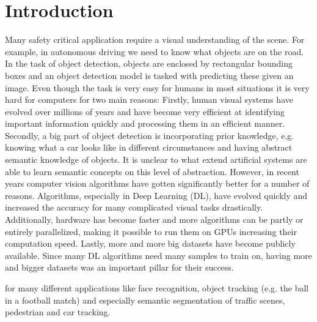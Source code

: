 \chapter{Introduction}
\label{chap:introduction}

Many safety critical application require a visual understanding of the scene. For example, in autonomous driving we need to know what objects are on the road. In the task of object detection, objects are enclosed by rectangular bounding boxes and an object detection model is tasked with predicting these given an image. Even though the task is very easy for humans in most situations it is very hard for computers for two main reasons: Firstly, human visual systems have evolved over millions of years and have become very efficient at identifying important information quickly and processing them in an efficient manner. Secondly, a big part of object detection is incorporating prior knowledge, e.g. knowing what a car looks like in different circumstances and having abstract semantic knowledge of objects. It is unclear to what extend artificial systems are able to learn semantic concepts on this level of abstraction. However, in recent years computer vision algorithms have gotten significantly better for a number of reasons. Algorithms, especially in Deep Learning (DL), have evolved quickly and increased the accuracy for many complicated visual tasks drastically. Additionally, hardware has become faster and more algorithms can be partly or entirely parallelized, making it possible to run them on GPUs increasing their computation speed. Lastly, more and more big datasets have become publicly available. Since many DL algorithms need many samples to train on, having more and bigger datasets was an important pillar for their success.

for many different applications like face recognition, object tracking (e.g. the ball in a football match) and especially semantic segmentation of traffic scenes, pedestrian and car tracking. 

